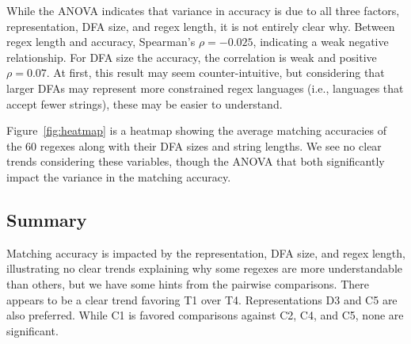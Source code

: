 While the ANOVA indicates that variance in accuracy is due to all three factors, representation, DFA size, and regex length, it is not entirely clear why. 
Between regex length and accuracy, Spearman's  $\rho=-0.025$, indicating  a weak negative relationship. 
For DFA size the accuracy,   the correlation is weak and positive $\rho=0.07$. At first, this result may seem counter-intuitive, but considering that larger DFAs may represent more constrained regex languages (i.e., languages that accept fewer strings), these may be easier to understand. %

Figure~\ref{fig:heatmap} is a heatmap showing the average matching accuracies of the 60 regexes along with their DFA sizes and string lengths. 
We  see no clear trends considering these variables, though the ANOVA that both significantly impact the variance in the matching accuracy. 

\subsection{Summary}
Matching accuracy is impacted by the representation, DFA size, and regex length, illustrating no clear trends explaining why some regexes are more understandable than others, but we have some hints from the pairwise comparisons. 
There appears to be a clear trend favoring T1 over T4. Representations D3 and C5 are also preferred. While C1 is favored  comparisons against C2, C4, and C5, none are significant. 



